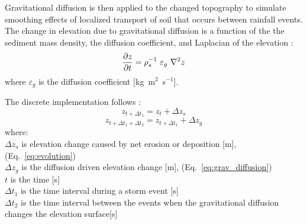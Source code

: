 \documentclass[gmd, manuscript]{copernicus}
\begin{document}
\noindent
Gravitational diffusion is then applied to the changed topography 
to simulate smoothing effects of localized transport of soil that
occurs between rainfall events.
The change in elevation due to gravitational diffusion
is a function of the the sediment mass density,
the diffusion coefficient, and Laplacian of the elevation
\citep{Thaxton2004}:
\begin{equation}
\label{eq:grav_diffusion} 
{\partial z \over \partial t } = \rho_s^{-1} ~ \varepsilon_g ~ \nabla^2 z 
\end{equation}
\noindent
where $\varepsilon_g$ is the diffusion coefficient [\unit{kg~m}$^{2}$~\unit{s}$^{-1}$].

The discrete implementation follows \cite{Thaxton2004}:
\begin{equation}
\label{eq:evolution_disc1} 
z_{t+ \Delta t_1} = z_t + \Delta z_s  
\end{equation}
\begin{equation}
\label{eq:evolution_disc2} 
z_{t+\Delta t_1+\Delta t_2} = z_{t+\Delta t_1} + \Delta z_g 
\end{equation}
{\small
where: \\
\noindent
\hspace*{0.5em} $\Delta z_s$ is elevation change caused by net erosion or deposition [\unit{m}], (Eq.~\ref{eq:evolution})\\
\hspace*{0.5em} $\Delta z_g$ is the diffusion driven elevation change [\unit{m}], (Eq.~\ref{eq:grav_diffusion})\\
\hspace*{0.5em} $t$ is the time [\unit{s}] \\
\hspace*{0.5em} $\Delta t_1$ is the time interval during a storm event [\unit{s}] \\
\hspace*{0.5em} $\Delta t_2$ is the time interval between the events when the gravitational diffusion changes the elevation surface[\unit{s}] \\
}
\end{document}
